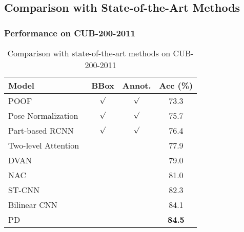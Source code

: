 \documentclass[journal]{IEEEtran}
\begin{document}
\subsection{Comparison with State-of-the-Art Methods}
\subsubsection{Performance on CUB-200-2011}
\begin{table}[!t]
  \centering
  \caption{Comparison with state-of-the-art methods on CUB-200-2011}
  \vspace{-0.1in}
  \label{tab:comparison_cub_2}
  \begin{tabular}{lccc}
    \hline\hline
    Model                & BBox & Annot. & Acc (\%)\\
    \hline
    POOF~\cite{poof}     & $\surd$   & $\surd$   & 73.3\\
    Pose Normalization~\cite{pose_normalized}  & $\surd$   & $\surd$   & 75.7\\
    Part-based RCNN~\cite{part-based-rcnn}          & $\surd$   & $\surd$   & 76.4\\
    Two-level Attention~\cite{two_level_attention}& & & 77.9\\
    DVAN       &           &           & 79.0\\
    NAC~\cite{nac} & & & 81.0\\
    ST-CNN~\cite{Jaderberg:2015vo} & & & 82.3\\
    Bilinear CNN~\cite{bilinear} & & & 84.1\\
    PD~\cite{Zhang_2016_CVPR} & & &\textbf{84.5}\\
    \hline\hline
  \end{tabular}
  \vspace{-0.2in}
\end{table}
\end{document}

